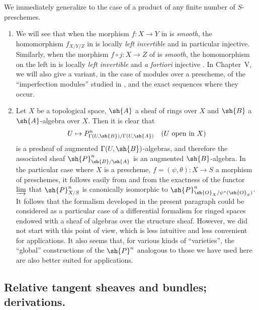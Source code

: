 We immediately generalize  to the case of a product of any finite number of $S$-preschemes.

\begin{remarks}[16.4.24]
\label{IV.16.4.24}
\medskip\noindent
\begin{enumerate}
  \item[(i)] We will see  that when the morphism $f: X \to Y$ in  is \emph{smooth}, the homomorphism $f_{X/Y/Z}$ in  is locally \emph{left invertible} and in particular injective.
  Similarly, when the morphism $f \circ j: X \to Z$ of  is \emph{smooth}, the homomorphism on the left in  is locally \emph{left invertible} and \textit{a fortiori} injective .
  In Chapter~V, we will also give a variant, in the case of modules over a prescheme, of the ``imperfection modules'' studied in , and the exact sequences where they occur.
  \item[(ii)] Let $X$ be a topological space, $\sh{A}$ a sheaf of  rings over $X$ and $\sh{B}$ a $\sh{A}$-algebra over $X$.
  Then it is clear that 
  \[
    U \mapsto P_{\Gamma(U, \sh{B})/\Gamma(U, \sh{A})}^n \quad \text{($U$ open in $X$)}
  \]
  is a presheaf of augmented $\Gamma(U, \sh{B})$-algebras, and therefore the associated sheaf $\sh{P}_{\sh{B}/\sh{A}}^n$ is an augmented $\sh{B}$-algebra.
  In the particular case where $X$ is a prescheme, $f = (\psi, \theta): X \to S$ a morphism of preschemes, it follows easily from  and from the exactness of the functor $\varinjlim$ that $\sh{P}_{X/S}^n$ is canonically isomorphic to $\sh{P}_{\sh{O}_X/\psi^*(\sh{O}_S)}^n$.
  It follows that the formalism developed in the present paragraph could be considered as a
  particular case of a differential formalism for ringed spaces endowed with a sheaf of algebras over the structure sheaf.
  However, we did not start with this point of view, which is less intuitive and less convenient for applications.
  It also seems that, for various kinds of ``varieties'', the ``global'' constructions of the $\sh{P}^n$ analogous to those we have used here are also better suited for applications.
\end{enumerate}
\end{remarks}

\subsection{Relative tangent sheaves and bundles; derivations.}
\label{IV.16.5}

